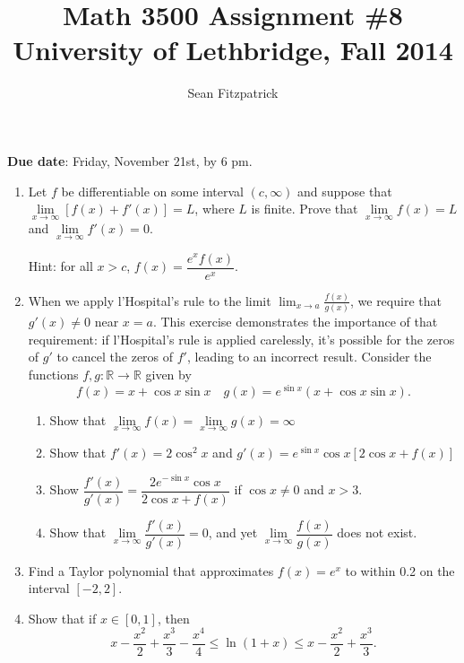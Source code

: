 \documentclass[letterpaper,12pt]{article}
\title{Math 3500 Assignment \#8\\University of Lethbridge, Fall 2014}
\author{Sean Fitzpatrick}
\newcommand{\R}{\mathbb{R}}
\begin{document}
 \maketitle


{\bf Due date}: Friday, November 21st, by 6 pm.


\begin{enumerate}
 \item Let $f$ be differentiable on some interval $(c,\infty)$ and suppose that $\lim\limits_{x\to\infty}[f(x)+f'(x)]=L$, where $L$ is finite. Prove that $\lim\limits_{x\to\infty}f(x)=L$ and $\lim\limits_{x\to\infty}f'(x)=0$.

Hint: for all $x>c$, $f(x)=\dfrac{e^xf(x)}{e^x}$.

 \item When we apply l'Hospital's rule to the limit $\displaystyle \lim_{x\to a}\frac{f(x)}{g(x)}$, we require that $g'(x)\neq 0$ near $x=a$. This exercise demonstrates the importance of that requirement: if l'Hospital's rule is applied carelessly, it's possible for the zeros of $g'$ to cancel the zeros of $f'$, leading to an incorrect result. Consider the functions $f,g:\R\to\R$ given by
\[
 f(x)=x+\cos x\sin x \quad g(x) =e^{\sin x}(x+\cos x\sin x).
\]
\begin{enumerate}
 \item Show that $\lim\limits_{x\to\infty}f(x)=\lim\limits_{x\to\infty}g(x)=\infty$
 \item Show that $f'(x)=2\cos^2x$ and $g'(x)=e^{\sin x}\cos x[2\cos x+f(x)]$
 \item Show $\dfrac{f'(x)}{g'(x)} = \dfrac{2e^{-\sin x}\cos x}{2\cos x+f(x)}$ if $\cos x\neq 0$ and $x>3$.
 \item Show that $\lim\limits_{x\to\infty}\dfrac{f'(x)}{g'(x)}=0$, and yet $\lim\limits_{x\to\infty}\dfrac{f(x)}{g(x)}$ does not exist.
\end{enumerate}
 \item Find a Taylor polynomial that approximates $f(x)=e^x$ to within 0.2 on the interval $[-2,2]$.
 \item Show that if $x\in [0,1]$, then
\[
 x-\frac{x^2}{2}+\frac{x^3}{3}-\frac{x^4}{4}\leq \ln(1+x) \leq x-\frac{x^2}{2}+\frac{x^3}{3}.
\]






\end{enumerate}
\end{document}
